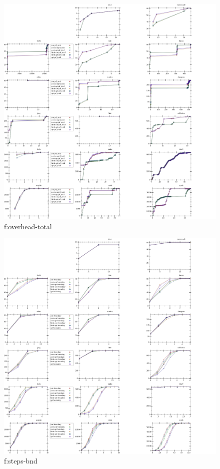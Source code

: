 \begin{figure}[t]
  \includegraphics[width=\textwidth]{data/cdf-overhead_prf_total.pdf}
  \caption{f:overhead-total}
  \label{f:overhead-total}
\end{figure}

\begin{figure}[t]
  \includegraphics[width=\textwidth]{data/cdf-steps_boundary.pdf}
  \caption{f:steps-bnd}
  \label{f:steps-bnd}
\end{figure}

